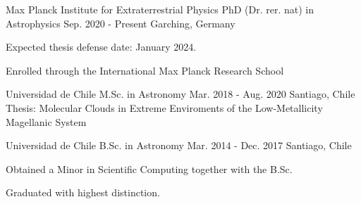 

\begin{cventries}

 \cventry
    {Max Planck Institute for Extraterrestrial Physics} %
    {PhD (Dr. rer. nat) in Astrophysics} %
    {Sep. 2020 - Present} %
    {Garching, Germany} %
    { \begin{cvitems} %
      \item{Expected thesis defense date: January 2024.}
       \item {Enrolled through the International Max Planck Research School}
      \end{cvitems}
      }


 \cventry
    {Universidad de Chile} %
    {M.Sc. in Astronomy} %
    {Mar. 2018 - Aug. 2020} %
    {Santiago, Chile} %
    {Thesis:   Molecular Clouds in Extreme Enviroments of the Low-Metallicity Magellanic System }

  \cventry
    {Universidad de Chile} %
    {B.Sc. in Astronomy} %
    {Mar. 2014 - Dec. 2017} %
     {Santiago, Chile} %
    {
      \begin{cvitems} %
      \item{Obtained a Minor in Scientific Computing together with the B.Sc.}
       \item {Graduated with highest distinction.}
      \end{cvitems}
    }

\end{cventries}
